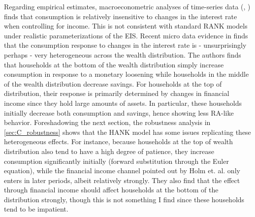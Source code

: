 Regarding empirical estimates, macroeconometric analyses of time-series data (\citet{campbell1989consumption}, \citet{yogo2004estimating}) finds that consumption is relatively insensitive to changes in the interest rate when controlling for income. This is not consistent with standard RANK models under realistic parameterizations of the EIS. Recent micro data evidence in \citet{holm2020transmission} finds that the consumption response to changes in the interest rate is - unsurprisingly perhaps - very heterogeneous across the wealth distribution. The authors finds that households at the bottom of the wealth distribution simply increase consumption in response to a monetary loosening while households in the middle of the wealth distribution decrease savings. For households at the top of distribution, their response is primarily determined by changes in financial income since they hold large amounts of assets. In particular, these households initially decrease both consumption and savings, hence showing less RA-like behavior. Foreshadowing the next section, the robustness analysis in \ref{sec:C_robustness} shows that the HANK model has some issues replicating these heterogeneous effects. For instance, because households at the top of wealth distribution also tend to have a high degree of patience, they increase consumption significantly initially (forward substitution through the Euler equation), while the financial income channel pointed out by Holm et. al. only enters in later periods, albeit relatively strongly. They also find that the effect through financial income should affect households at the bottom of the distribution strongly, though this is not something I find since these households tend to be impatient.






